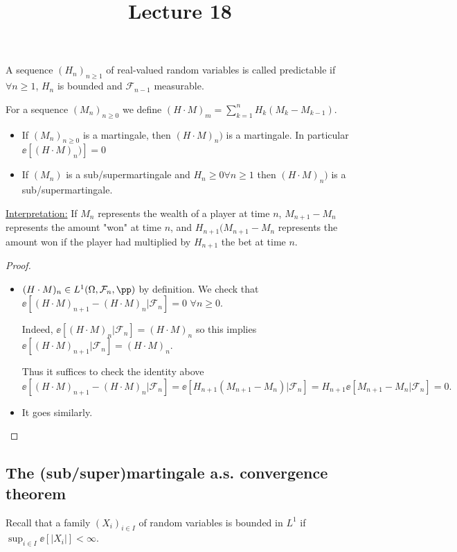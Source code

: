 \documentclass[../main.tex]{subfiles}
\title{Lecture 18}
\begin{document}
\begin{proposition}
  A sequence $(H_n)_{n \geq 1}$ of real-valued random variables is called
  predictable if $\forall n \geq 1$, $H_n$ is bounded and $\mathcal{F}_{n-1}$
  measurable.

  For a sequence $(M_n)_{n \geq 0}$ we define $(H \cdot M)_{m} = \sum_{k=1}^n
  H_k(M_k - M_{k-1})$.
  \begin{itemize}
    \item If $(M_n)_{n \geq 0}$ is a martingale, then $(H \cdot M)_n)$ is a
      martingale. In particular $\ee[(H \cdot M)_n)] = 0$
    \item If $(M_n)$ is a sub/supermartingale and $H_n \geq 0 \forall n \geq 1$ 
      then  $(H \cdot M)_n)$ is a sub/supermartingale.
  \end{itemize}
\end{proposition}
\underline{Interpretation:} If $M_n$ represents the wealth of a player at time
$n$, $M_{n+1} - M_n$ represents the amount "won" at time $n$, and
$H_{n+1}(M_{n+1} - M_n$ represents the amount won if the player had multiplied
by $H_{n+1}$ the bet at time $n$.

\begin{proof}
    \hfill
    \begin{itemize}
      \item $(H \cdot M)_{n} \in L^1(\Omega, \mathcal{F}_n, \pp)$ by definition.
        We check that $\ee[(H \cdot M)_{n+1} - (H \cdot M)_{n} | \mathcal{F}_n]
        = 0$ $\forall n \geq 0$.

        Indeed, $\ee[(H \cdot M)_n | \mathcal{F}_n] = (H \cdot M)_{n}$ so this
        implies $\ee[(H \cdot M)_{n+1} | \mathcal{F}_n] = (H \cdot M)_{n}$.

        Thus it suffices to check the identity above
        \[
          \ee[(H \cdot M)_{n+1}- (H \cdot M)_n | \mathcal{F}_n] =
          \ee[H_{n+1}(M_{n+1} - M_n) | \mathcal{F}_n] = H_{n+1} \ee[M_{n+1} -
          M_n | \mathcal{F}_n] = 0
        .\] 
    \item It goes similarly. 
    \end{itemize}
\end{proof}   

\subsection{The (sub/super)martingale a.s. convergence theorem}
Recall that a family $(X_i)_{i \in I}$ of random variables is bounded in $L^1$
if $\sup_{i \in I} \ee[|X_i|] < \infty$.
\end{document}
